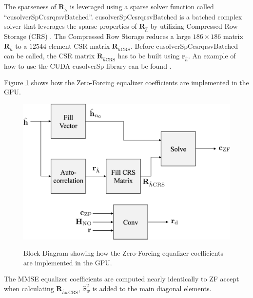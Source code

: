 The sparseness of $\mathbf{R}_{\hat{h}}$ is leveraged using a sparse solver function called ``cusolverSpCcsrqrsvBatched''.
cusolverSpCcsrqrsvBatched is a batched complex solver that leverages the sparse properties of $\mathbf{R}_{\hat{h}}$ by utilizing Compressed Row Storage (CRS) \cite{wiki:Sparse_matrix}.
The Compressed Row Storage reduces a large $186\times186$ matrix $\mathbf{R}_{\hat{h}}$ to a $12544$ element CSR matrix $\mathbf{R}_{\hat{h}\text{CRS}}$.
Before cusolverSpCcsrqrsvBatched can be called, the CSR matrix $\mathbf{R}_{\hat{h}\text{CRS}}$ has to be built using $\mathbf{r}_{\hat{h}}$.
An example of how to use the CUDA cusolverSp library can be found \cite{CUDA_toolkit_doc}.

Figure \ref{fig:blockZF} shows how the Zero-Forcing equalizer coefficients are implemented in the GPU.
\begin{figure}
	\caption{Block Diagram showing how the Zero-Forcing equalizer coefficients are implemented in the GPU.}
	\centering\includegraphics[width=7.5in/100*55]{figures/eq_GPUimplementation/blockZF.pdf}
	\label{fig:blockZF}
\end{figure}
The MMSE equalizer coefficients are computed nearly identically to ZF accept when calculating $\mathbf{R}_{\hat{h}w\text{CRS}}$, $\hat{\sigma}^2_w$ is added to the main diagonal elements.
